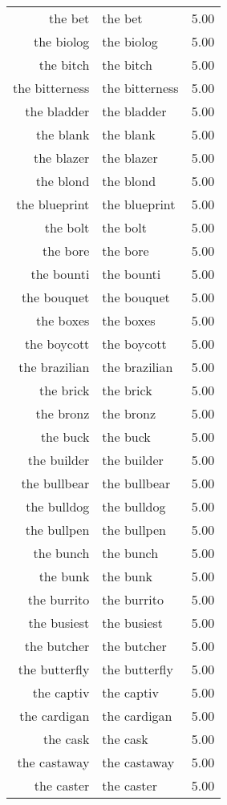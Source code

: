 \begin{table}[ht]
\begin{tabular}{rlr}
  the bet & the bet & 5.00 \\ 
  the biolog & the biolog & 5.00 \\ 
  the bitch & the bitch & 5.00 \\ 
  the bitterness & the bitterness & 5.00 \\ 
  the bladder & the bladder & 5.00 \\ 
  the blank & the blank & 5.00 \\ 
  the blazer & the blazer & 5.00 \\ 
  the blond & the blond & 5.00 \\ 
  the blueprint & the blueprint & 5.00 \\ 
  the bolt & the bolt & 5.00 \\ 
  the bore & the bore & 5.00 \\ 
  the bounti & the bounti & 5.00 \\ 
  the bouquet & the bouquet & 5.00 \\ 
  the boxes & the boxes & 5.00 \\ 
  the boycott & the boycott & 5.00 \\ 
  the brazilian & the brazilian & 5.00 \\ 
  the brick & the brick & 5.00 \\ 
  the bronz & the bronz & 5.00 \\ 
  the buck & the buck & 5.00 \\ 
  the builder & the builder & 5.00 \\ 
  the bullbear & the bullbear & 5.00 \\ 
  the bulldog & the bulldog & 5.00 \\ 
  the bullpen & the bullpen & 5.00 \\ 
  the bunch & the bunch & 5.00 \\ 
  the bunk & the bunk & 5.00 \\ 
  the burrito & the burrito & 5.00 \\ 
  the busiest & the busiest & 5.00 \\ 
  the butcher & the butcher & 5.00 \\ 
  the butterfly & the butterfly & 5.00 \\ 
  the captiv & the captiv & 5.00 \\ 
  the cardigan & the cardigan & 5.00 \\ 
  the cask & the cask & 5.00 \\ 
  the castaway & the castaway & 5.00 \\ 
  the caster & the caster & 5.00 \\ 

\end{tabular}
\end{table}
